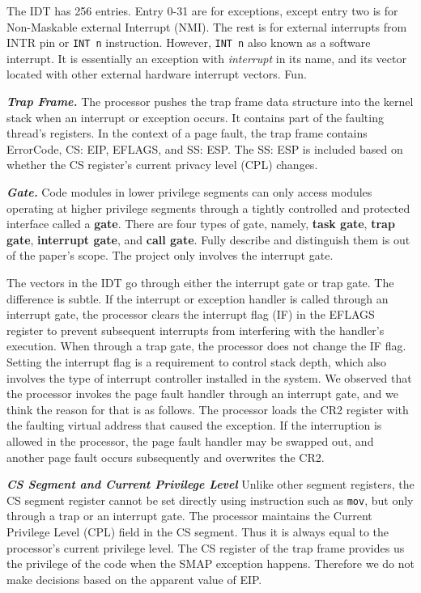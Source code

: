 The IDT has 256 entries. Entry 0-31 are for exceptions, except entry two is for Non-Maskable external Interrupt (NMI). The rest is for external interrupts from INTR pin or \texttt{INT n} instruction. However, \texttt{INT n} also known as a software interrupt. It is essentially an exception with \textit{interrupt} in its name, and its vector located with other external hardware interrupt vectors. Fun.



\textbf{\textit{Trap Frame.}}  The processor pushes the trap frame data structure into the kernel stack when an interrupt or exception occurs.
It contains part of the faulting thread's registers. In the context of a page fault, the trap frame contains ErrorCode, CS: EIP, EFLAGS, and SS: ESP. The SS: ESP is included based on whether the CS register's current privacy level (CPL) changes. 



\textbf{\textit{Gate.}} Code modules in lower privilege segments can only access modules operating at higher privilege segments through a tightly controlled and protected interface called a \textbf{gate}.  There are four types of gate, namely, \textbf{task gate}, \textbf{trap gate}, \textbf{interrupt gate}, and \textbf{call gate}. Fully describe and distinguish them is out of the paper's scope. The project only involves the interrupt gate.

The vectors in the IDT go through either the interrupt gate or trap gate. The difference is subtle. If the interrupt or exception handler is called through an interrupt gate, the processor clears the interrupt flag (IF) in the EFLAGS register to prevent subsequent interrupts from interfering with the handler's execution.  When through a trap gate, the processor does not change the IF flag. Setting the interrupt flag is a requirement to control stack depth, which also involves the type of interrupt controller installed in the system. We observed that the processor invokes the page fault handler through an interrupt gate, and we think the reason for that is as follows. The processor loads the CR2 register with the faulting virtual address that caused the exception. If the interruption is allowed in the processor, the page fault handler may be swapped out, and another page fault occurs subsequently and overwrites the CR2. 



\textbf{\textit{CS Segment and Current Privilege Level}} Unlike other segment registers, the CS segment register cannot be set directly using instruction such as \texttt{mov},  but only through a trap or an interrupt gate.  The processor maintains the Current Privilege Level (CPL) field in the CS segment. Thus it is always equal to the processor's current privilege level. The CS register of the trap frame provides us the privilege of the code when the SMAP exception happens. Therefore we do not make decisions based on the apparent value of EIP.


